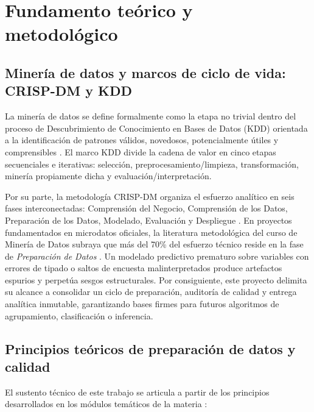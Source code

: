 \section{Fundamento teórico y metodológico}

\subsection{Minería de datos y marcos de ciclo de vida: CRISP-DM y KDD}
La minería de datos se define formalmente como la etapa no trivial dentro del proceso de Descubrimiento de Conocimiento en Bases de Datos (KDD) orientada a la identificación de patrones válidos, novedosos, potencialmente útiles y comprensibles \parencite{fayyad1996data, fayyad1996kdd}. El marco KDD divide la cadena de valor en cinco etapas secuenciales e iterativas: selección, preprocesamiento/limpieza, transformación, minería propiamente dicha y evaluación/interpretación.

Por su parte, la metodología CRISP-DM organiza el esfuerzo analítico en seis fases interconectadas: Comprensión del Negocio, Comprensión de los Datos, Preparación de los Datos, Modelado, Evaluación y Despliegue \parencite{chapman2000crisp}. En proyectos fundamentados en microdatos oficiales, la literatura metodológica del curso de Minería de Datos subraya que más del 70\% del esfuerzo técnico reside en la fase de \textit{Preparación de Datos} \parencite{umsa2026curso}. Un modelado predictivo prematuro sobre variables con errores de tipado o saltos de encuesta malinterpretados produce artefactos espurios y perpetúa sesgos estructurales. Por consiguiente, este proyecto delimita su alcance a consolidar un ciclo de preparación, auditoría de calidad y entrega analítica inmutable, garantizando bases firmes para futuros algoritmos de agrupamiento, clasificación o inferencia.

\subsection{Principios teóricos de preparación de datos y calidad}
El sustento técnico de este trabajo se articula a partir de los principios desarrollados en los módulos temáticos de la materia \parencite{umsa2026curso}:

